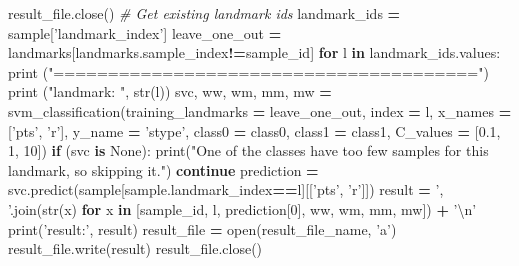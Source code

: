 \documentclass[10pt,letterpaper]{article}
\newenvironment{Shaded}{\begin{snugshade}}{\end{snugshade}}
\newcommand{\KeywordTok}[1]{\textcolor[rgb]{0.13,0.29,0.53}{\textbf{#1}}}
\newcommand{\DecValTok}[1]{\textcolor[rgb]{0.00,0.00,0.81}{#1}}
\newcommand{\FloatTok}[1]{\textcolor[rgb]{0.00,0.00,0.81}{#1}}
\newcommand{\CharTok}[1]{\textcolor[rgb]{0.31,0.60,0.02}{#1}}
\newcommand{\StringTok}[1]{\textcolor[rgb]{0.31,0.60,0.02}{#1}}
\newcommand{\CommentTok}[1]{\textcolor[rgb]{0.56,0.35,0.01}{\textit{#1}}}
\newcommand{\VariableTok}[1]{\textcolor[rgb]{0.00,0.00,0.00}{#1}}
\newcommand{\ControlFlowTok}[1]{\textcolor[rgb]{0.13,0.29,0.53}{\textbf{#1}}}
\newcommand{\OperatorTok}[1]{\textcolor[rgb]{0.81,0.36,0.00}{\textbf{#1}}}
\newcommand{\BuiltInTok}[1]{#1}
\newcommand{\NormalTok}[1]{#1}
\begin{document}
\begin{Shaded}
\begin{Highlighting}[]
\NormalTok{    result_file.close()}
    \CommentTok{# Get existing landmark ids}
\NormalTok{    landmark_ids }\OperatorTok{=}\NormalTok{ sample[}\StringTok{'landmark_index'}\NormalTok{]}
\NormalTok{    leave_one_out }\OperatorTok{=}\NormalTok{ landmarks[landmarks.sample_index}\OperatorTok{!=}\NormalTok{sample_id]}
    \ControlFlowTok{for}\NormalTok{ l }\KeywordTok{in}\NormalTok{ landmark_ids.values:}
        \BuiltInTok{print}\NormalTok{ (}\StringTok{"======================================="}\NormalTok{)}
        \BuiltInTok{print}\NormalTok{ (}\StringTok{"landmark: "}\NormalTok{, }\BuiltInTok{str}\NormalTok{(l))}
\NormalTok{        svc, ww, wm, mm, mw }\OperatorTok{=}\NormalTok{ svm_classification(training_landmarks }\OperatorTok{=}\NormalTok{ leave_one_out,}
\NormalTok{                                                 index }\OperatorTok{=}\NormalTok{ l,}
\NormalTok{                                                 x_names }\OperatorTok{=}\NormalTok{ [}\StringTok{'pts'}\NormalTok{, }\StringTok{'r'}\NormalTok{],}
\NormalTok{                                                 y_name }\OperatorTok{=} \StringTok{'stype'}\NormalTok{,}
\NormalTok{                                                 class0 }\OperatorTok{=}\NormalTok{ class0,}
\NormalTok{                                                 class1 }\OperatorTok{=}\NormalTok{ class1,}
\NormalTok{                                                 C_values }\OperatorTok{=}\NormalTok{ [}\FloatTok{0.1}\NormalTok{, }\DecValTok{1}\NormalTok{, }\DecValTok{10}\NormalTok{])}
        \ControlFlowTok{if}\NormalTok{ (svc }\KeywordTok{is} \VariableTok{None}\NormalTok{):}
            \BuiltInTok{print}\NormalTok{(}\StringTok{"One of the classes have too few samples for this landmark, so skipping it."}\NormalTok{)}
            \ControlFlowTok{continue}
\NormalTok{        prediction }\OperatorTok{=}\NormalTok{ svc.predict(sample[sample.landmark_index}\OperatorTok{==}\NormalTok{l][[}\StringTok{'pts'}\NormalTok{, }\StringTok{'r'}\NormalTok{]])}
\NormalTok{        result }\OperatorTok{=} \StringTok{', '}\NormalTok{.join(}\BuiltInTok{str}\NormalTok{(x) }\ControlFlowTok{for}\NormalTok{ x }\KeywordTok{in}\NormalTok{ [sample_id, l, prediction[}\DecValTok{0}\NormalTok{], ww, wm, mm, mw]) }\OperatorTok{+} \StringTok{'}\CharTok{\textbackslash{}n}\StringTok{'}
        \BuiltInTok{print}\NormalTok{(}\StringTok{'result:'}\NormalTok{, result)}
\NormalTok{        result_file }\OperatorTok{=} \BuiltInTok{open}\NormalTok{(result_file_name, }\StringTok{'a'}\NormalTok{)}
\NormalTok{        result_file.write(result)}
\NormalTok{        result_file.close()}
\end{Highlighting}
\end{Shaded}
\end{document}
